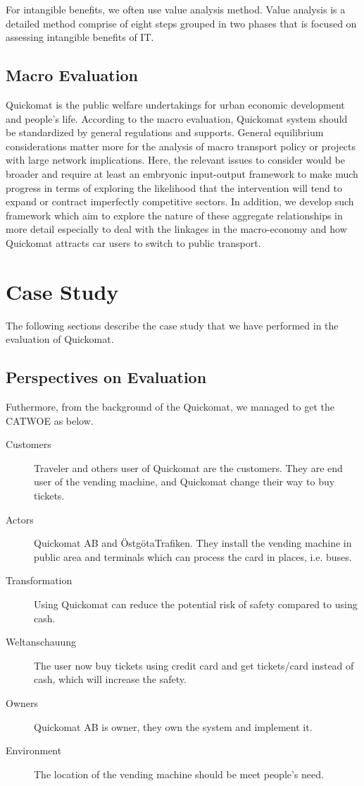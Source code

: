 \documentclass[twocolumn]{article}
\begin{document}
For intangible benefits, we often use value analysis method. Value analysis is a detailed method comprise of eight steps grouped in two phases that is focused on assessing intangible benefits of IT.

\subsection{Macro Evaluation}
Quickomat is the public welfare undertakings for urban economic development and people’s life. According to the macro evaluation, Quickomat system should be standardized by general regulations and supports. General equilibrium considerations matter more for the analysis of macro transport policy or projects with large network implications. Here, the relevant issues to consider would be broader and require at least an embryonic input-output framework to make much progress in terms of exploring the likelihood that the intervention will tend to expand or contract imperfectly competitive sectors. In addition, we develop such framework which aim to explore the nature of these aggregate relationships in more detail especially to deal with the linkages in the macro-economy and how Quickomat attracts car users to switch to public transport.

\section{Case Study}
The following sections describe the case study that we have performed in the evaluation of  Quickomat.

\subsection{Perspectives on Evaluation}

Futhermore, from the background of the Quickomat, we managed to get the CATWOE as below.
\begin{description}
  \item[Customers]
    Traveler and others user of Quickomat are the customers. They are end user of the vending machine, and Quickomat change their way to buy tickets.
  \item[Actors]
    Quickomat AB and ÖstgötaTrafiken. They install the vending machine in public area and terminals which can process the card in places, i.e. buses.
  \item[Transformation]
    Using Quickomat can reduce the potential risk of safety compared to using cash.
  \item[Weltanschauung]
    The user now buy tickets using credit card and get tickets/card instead of cash, which will increase the safety.
  \item[Owners]
    Quickomat AB is owner, they own the system and implement it.
  \item[Environment]
    The location of the vending machine should be meet people’s need.
\end{description}
\end{document}
